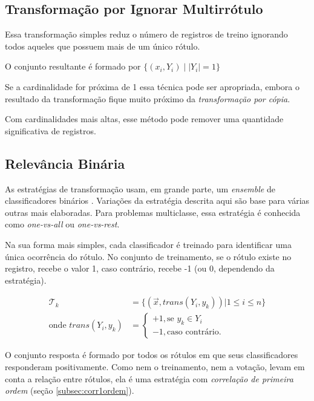 \documentclass[runningheads,a4paper]{llncs}
\begin{document}
\subsection{Transformação por Ignorar Multirrótulo} \label{subsec:ignorarmultirrotulo}

Essa transformação simples reduz o número de registros de treino ignorando todos aqueles que possuem mais de um único rótulo.

O conjunto resultante é formado por $\{ (x_i, Y_i) \mid |Y_i| = 1 \}$


Se a cardinalidade for próxima de 1 essa técnica pode ser apropriada, embora o resultado da transformação fique muito próximo da \textit{transformação por cópia}.

Com cardinalidades mais altas, esse método pode remover uma quantidade significativa de registros.

\subsection{Relevância Binária} \label{subsec:relevanciabinaria}

As estratégias de transformação usam, em grande parte, um \textit{ensemble} de classificadores binários \cite{Zhang2014-be}. Variações da estratégia descrita aqui são base para várias outras mais elaboradas. Para problemas multiclasse, essa estratégia é conhecida como \textit{one-vs-all} ou \textit{one-vs-rest}.

Na sua forma mais simples, cada classificador é treinado para identificar uma única ocorrência do rótulo. No conjunto de treinamento, se o rótulo existe no registro, recebe o valor 1, caso contrário, recebe -1 (ou 0, dependendo da estratégia).

\begin{align*}
\mathcal{T}_k& = \{ (\vec{x}, trans(Y_i, y_k)) | 1 \leq i \leq n \} \\
\text{onde } trans(Y_i, y_k) &= \begin{cases}
				 				  +1, \text{se $y_k \in Y_i$}\\
								  -1, \text{caso contrário.}
			  				    \end{cases}
\end{align*}

O conjunto resposta é formado por todos os rótulos em que seus classificadores responderam positivamente. Como nem o treinamento, nem a votação, levam em conta a relação entre rótulos, ela é uma estratégia com \textit{correlação de primeira ordem} (seção \ref{subsec:corr1ordem}).
\end{document}
